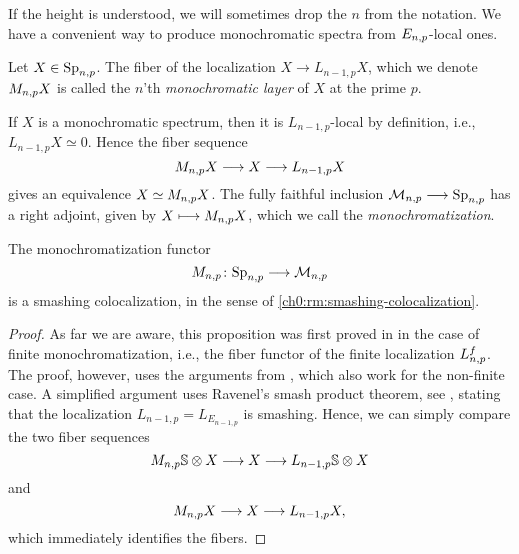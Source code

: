 If the height is understood, we will sometimes drop the $n$ from the notation. We have a convenient way to produce monochromatic spectra from $E_{n,p}$-local ones. 

\begin{definition}
    Let $X\in \mathrm{Sp}_{n,p}$. The fiber of the localization $X\longrightarrow L_{n-1,p}X$, which we denote $M_{n,p} X$ is called the $n$'th \emph{monochromatic layer} of $X$ at the prime $p$.
\end{definition}

\begin{remark}
    If $X$ is a monochromatic spectrum, then it is $L_{n-1,p}$-local by definition, i.e., $L_{n-1,p}X\simeq 0$. Hence the fiber sequence 
    \[M_{n,p} X\longrightarrow X\longrightarrow L_{n-1,p}X\]
    gives an equivalence $X\simeq M_{n,p} X$. The fully faithful inclusion $\mathcal{M}_{n,p}\longrightarrow \mathrm{Sp}_{n,p}$ has a right adjoint, given by $X\longmapsto M_{n,p} X$, which we call the \emph{monochromatization}. 
\end{remark}

\begin{proposition}
    \label{ch0:prop:monochromatization-is-smashing}
    The monochromatization functor 
    \[M_{n,p}\colon \mathrm{Sp}_{n,p}\longrightarrow \mathcal{M}_{n,p}\] 
    is a smashing colocalization, in the sense of \cref{ch0:rm:smashing-colocalization}.
\end{proposition}
\begin{proof}
    As far we are aware, this proposition was first proved in \cite[Sec 6.3]{bousfield_1996} in the case of finite monochromatization, i.e., the fiber functor of the finite localization $L_{n,p}^f$. The proof, however, uses the arguments from \cite[2.10]{bousfield_1979_bool}, which also work for the non-finite case. A simplified argument uses Ravenel's smash product theorem, see \cite[7.5.6]{ravenel_92}, stating that the localization $L_{n-1,p} = L_{E_{n-1,p}}$ is smashing. Hence, we can simply compare the two fiber sequences
    \[M_{n,p} \mathbb{S} \otimes X \longrightarrow X \longrightarrow L_{n-1,p}\mathbb{S}\otimes X\] 
    and 
    \[M_{n,p} X\longrightarrow X\longrightarrow L_{n-1,p} X,\]
    which immediately identifies the fibers.  
\end{proof}



